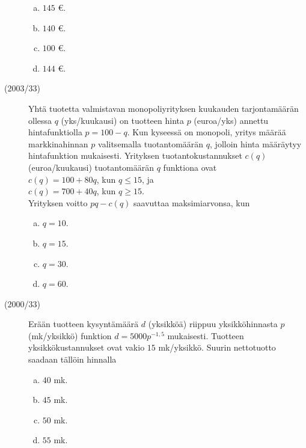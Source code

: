 \begin{description}
		\begin{enumerate}[(a)]
			\item $145$ \euro.
			\item $140$ \euro.
			\item $100$ \euro.
			\item $144$ \euro.
		\end{enumerate}


	\item[(2003/33)] Yhtä tuotetta valmistavan monopoliyrityksen kuukauden tarjontamäärän ollessa $q$ (yks/kuukausi) on tuotteen hinta $p$ (euroa/yks) annettu hintafunktiolla $p = 100-q$. Kun kyseessä on monopoli, yritys määrää markkinahinnan $p$ valitsemalla tuotantomäärän $q$, jolloin hinta määräytyy hintafunktion mukaisesti. Yrityksen tuotantokustannukset $c(q)$ (euroa/kuukausi) tuotantomäärän $q$ funktiona ovat\\
$c(q)=100+80q$, kun $q\leq 15$, ja\\
$c(q)=700+40q$, kun $q\geq 15$.\\
Yrityksen voitto $pq-c(q)$ saavuttaa maksimiarvonsa, kun
        
		\begin{enumerate}[(a)]
			\item $q=10$.
			\item $q=15$.
			\item $q=30$.
			\item $q=60$.
		\end{enumerate}


	\item[(2000/33)] Erään tuotteen kysyntämäärä $d$ (yksikköä) riippuu yksikköhinnasta $p$ (mk/yksikkö) funktion $d=5000p^{-1{,}5}$ mukaisesti. Tuotteen yksikkökustannukset ovat vakio $15$ mk/yksikkö. Suurin nettotuotto saadaan tällöin hinnalla
        
		\begin{enumerate}[(a)]
			\item $40$ mk.
			\item $45$ mk.
			\item $50$ mk.
			\item $55$ mk.
		\end{enumerate}

	
\end{description}
